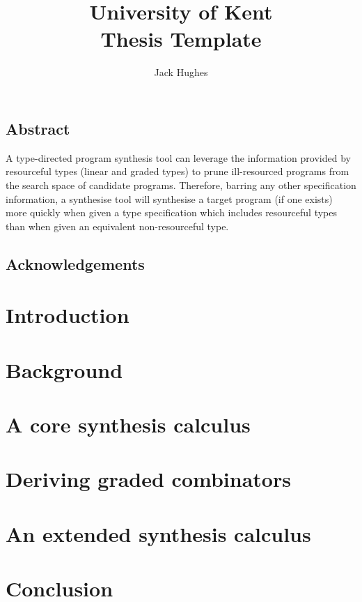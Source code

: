 \documentclass[11pt]{UoKthesis}
\theoremstyle{plain}%
\theoremstyle{definition}
\begin{document}
\normalsize
\title{University of Kent\\Thesis Template}
\author{Jack Hughes}
\subject{computer science}

\begin{preface}
\section{Abstract}
A type-directed program synthesis tool can leverage the information provided by
resourceful types (linear and graded types) to prune ill-resourced programs from
the search space of candidate programs. Therefore, barring any other
specification information, a synthesise tool will synthesise a target program
(if one exists) more quickly when given a type specification which includes
resourceful types than when given an equivalent non-resourceful type.


\section{Acknowledgements}
\end{preface}


\chapter{Introduction}
\label{chapter:intro}


\chapter{Background}
\label{chapter:background}


\chapter{A core synthesis calculus}
\label{chapter:core}


\chapter{Deriving graded combinators}
\label{chapter:deriving}


\chapter{An extended synthesis calculus}
\label{chapter:extended}


\chapter{Conclusion}
\label{chapter:conclusion}




\appendix
\end{document}
